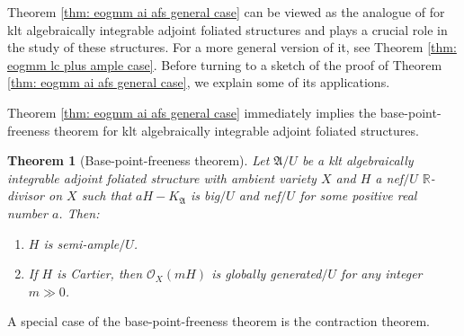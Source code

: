 \documentclass[12pt]{amsart}
\numberwithin{equation}{section}
\newcommand{\Rr}{\mathbb{R}}
\newcommand{\Aa}{{\mathfrak{A}}}
\newtheorem{thmsub}{Theorem}[subsection]
\theoremstyle{definition}
\theoremstyle{definition}
\theoremstyle{definition}
\begin{document}
Theorem \ref{thm: eogmm ai afs general case} can be viewed as the analogue of \cite[Theorem 1.2]{BCHM10} for klt algebraically integrable adjoint foliated structures and plays a crucial role in the study of these structures. 
For a more general version of it, see Theorem \ref{thm: eogmm lc plus ample case}. Before turning to a sketch of the proof of Theorem \ref{thm: eogmm ai afs general case}, we explain some of its applications.



   


Theorem \ref{thm: eogmm ai afs general case} immediately implies the base-point-freeness theorem for klt algebraically integrable adjoint foliated structures.

\begin{thmsub}[Base-point-freeness theorem]\label{thm: bpf ai afs}
 Let $\Aa/U$ be a klt algebraically integrable adjoint foliated structure with ambient variety $X$ and $H$ a nef$/U$ $\Rr$-divisor on $X$ such that $aH-K_{\Aa}$ is big$/U$ and nef$/U$ for some positive real number $a$. Then: 
 \begin{enumerate}
     \item $H$ is semi-ample$/U$.
     \item If $H$ is Cartier, then $\mathcal{O}_X(mH)$ is globally generated$/U$ for any integer $m\gg 0$.
 \end{enumerate}
\end{thmsub}

A special case of the base-point-freeness theorem is the contraction theorem.
\end{document}
